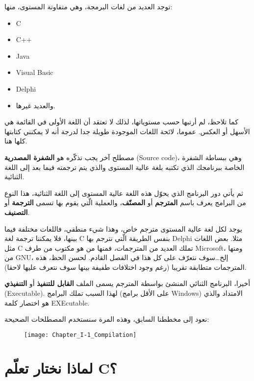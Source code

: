 توجد العديد من لغات البرمجة، وهي متفاوتة المستوى، منها:
\begin{itemize}
  \item \textenglish{C}
  \item \textenglish{C++}
  \item \textenglish{Java}
  \item \textenglish{Visual Basic}
  \item \textenglish{Delphi}
  \item والعديد غيرها.
\end{itemize}

كما تلاحظ، لم أرتبها حسب مستوياتها، لذلك لا تعتقد أن اللغة الأولى في القائمة هي الأسهل أو العكس. عموما، لائحة اللغات الموجودة طويلة جدا لدرجة أنه لا يمكنني كتابتها كلها هنا.

مصطلح آخر يجب تذكّره هو
\textbf{الشفرة المصدرية}
(\textenglish{Source code})،
 وهي ببساطة الشفرة الخاصة ببرنامجك الذي تكتبه بلغة عالية المستوى والذي يتم ترجمته فيما بعد إلى اللغة الثنائية.

 ثم يأتي دور البرنامج الذي يحوّل هذه اللغة عالية المستوى إلى اللغة الثنائية، هذا النوع من البرامج يعرف باسم
 \textbf{المترجم}
  أو
  \textbf{المصنّف}،
 والعملية الّتي يقوم بها تسمى
 \textbf{الترجمة}
 أو
 \textbf{التصنيف}.

\begin{information}
  يوجد لكل لغة عالية المستوى مترجم خاص، وهذا شيء منطقي، فاللغات مختلفة فيما بينها، فلا يمكننا ترجمة لغة
\textenglish{C}
بنفس الطريقة الّتي نترجم بها
\textenglish{Delphi}
مثلا.
  بعض اللغات مثل
\textenglish{C}
تملك العديد من المترجمات، فمنها من هو مكتوب من طرف
\textenglish{Microsoft}، ومنها من
\textenglish{GNU}،
إلخ\dots سوف نتعرّف على كل هذا في الفصل القادم.
  لحسن الحظ، هذه المترجمات متطابقة تقريبا (رغم وجود اختلافات طفيفة بينها سوف نتعرف عليها لاحقا).
\end{information}

أخيرا، البرنامج الثنائي المنشئ بواسطة المترجم يسمى الملف
\textbf{القابل للتنفيذ}
أو
\textbf{التنفيذي}
(\textenglish{Executable}).
 لهذا السبب تملك البرامج
 (على الأقل برامج
 \textenglish{Windows})
 الامتداد
 والذي هو اختصار كلمة
 \textenglish{EXEcutable}.

 نعود إلى مخططنا السابق، وهذه المرة سنستخدم المصطلحات الصحيحة:

\begin{figure}[H]
	\centering
	\texttt{[image: Chapter\_I-1\_Compilation]}
\end{figure}

 \section{لماذا نختار تعلّم \textenglish{C}؟}
 
